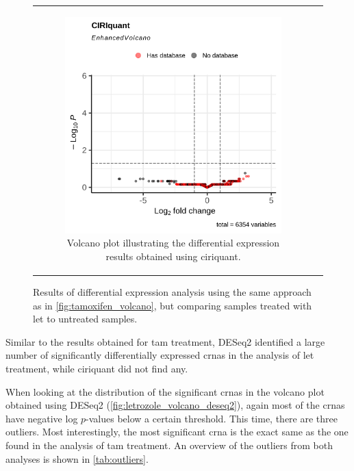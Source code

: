 \begin{figure}[H]
\begin{tabular}{cc}
\begin{subfigure}{0.5\textwidth}
            \includegraphics[width=\linewidth]{chapters/4_results_and_discussion/figures/dea/ciriquant/letrozole/volcano.png}
            \caption{Volcano plot illustrating the differential expression
                results obtained using \gls{ciriquant}.
            }
            \label{fig:letrozole_volcano_ciriquant}
        \end{subfigure} &

    \end{tabular}
    \caption{Results of differential expression analysis using the same
        approach as in
        \cref{fig:tamoxifen_volcano}, but comparing samples treated with
        \gls{let}
        to untreated samples.
    }
    \label{fig:letrozole_volcano}
\end{figure}

Similar to the results obtained for \gls{tam} treatment, DESeq2 identified a
large number of significantly differentially expressed \glspl{crna} in the
analysis of \gls{let} treatment, while \gls{ciriquant} did not find any.

When looking at the distribution of the significant \glspl{crna} in the volcano
plot obtained using DESeq2 (\cref{fig:letrozole_volcano_deseq2}), again most of
the \glspl{crna} have negative log $p$-values below a certain threshold.
This time, there are three outliers.
Most interestingly, the most significant \gls{crna} is the exact same as the
one found in the analysis of \gls{tam} treatment.
An overview of the outliers from both analyses is shown in \cref{tab:outliers}.

